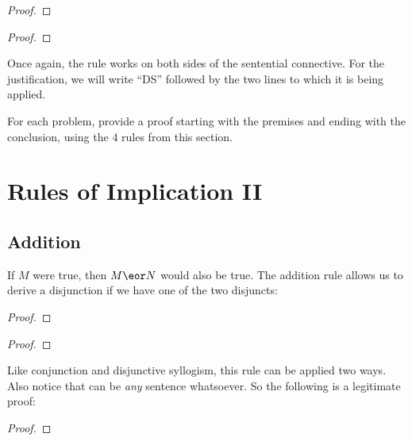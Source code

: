 \begin{multicols}{2}
\begin{proof}
	 
\end{proof}

\begin{proof}
	 
\end{proof}
\end{multicols}

Once again, the rule works on both sides of the sentential connective. For the justification, we will write ``DS'' followed by the two lines to which it is being applied.


\practiceproblems
\noindent\problempart For each problem, provide a proof starting with the premises and ending with the conclusion, using the 4 rules from this section.

\section{Rules of Implication II}

\subsection{Addition}
If $M$ were true, then $M \eor N$ would also be true. The addition rule allows us to derive a disjunction if we have one of the two disjuncts:

\begin{multicols}{2}

\begin{proof}
\end{proof}

\begin{proof}
\end{proof}

\end{multicols}

Like conjunction and disjunctive syllogism, this rule can be applied two ways. Also notice that  can be \emph{any} sentence whatsoever. So the following is a legitimate proof:

\begin{proof}
\end{proof}

